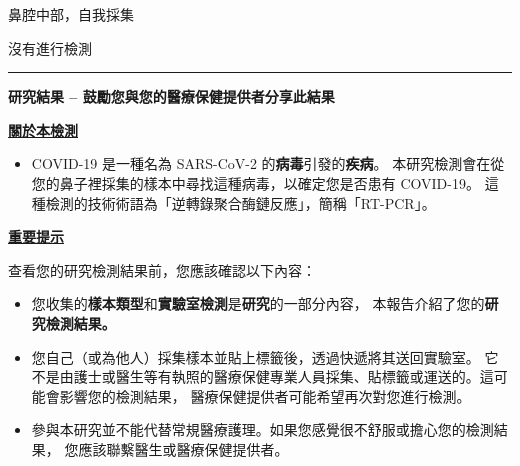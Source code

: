 \documentclass[10pt]{article}
\newcommand{\PageLine}{\rule{\textwidth}{0.25mm}}
\begin{document}
\sloppy %

\begin{description}[font=\normalfont,align=left,labelwidth=6em]
\item [\textbf{\VAR{pat_name|e}}]
\item [\textbf{出生日期：}] 
\item [\textbf{標本：}] 鼻腔中部，自我採集
\item [\textbf{採集條碼：}] 
\item [\textbf{採集日期：}] 
\item [\textbf{報告日期：}]
  沒有進行檢測
\end{description}

\PageLine

\begin{center}
\Large
\textbf{研究結果 – 鼓勵您與您的醫療保健提供者分享此結果}
\end{center}

\bigskip

\large \underline{\textbf{關於本檢測}}

\begin{itemize}
\item

  COVID-19 是一種名為 SARS-CoV-2 的\textbf{病毒}引發的\textbf{疾病}。
  本研究檢測會在從您的鼻子裡採集的樣本中尋找這種病毒，以確定您是否患有 COVID-19。
  這種檢測的技術術語為「逆轉錄聚合酶鏈反應」，簡稱「RT-PCR」。

\end{itemize}

\bigskip

\large \underline{\textbf{重要提示}}

查看您的研究檢測結果前，您應該確認以下內容：

\begin{itemize}
\item

  您收集的\textbf{樣本類型}和\textbf{實驗室檢測}是\textbf{研究}的一部分內容，
  本報告介紹了您的\textbf{研究檢測結果。}

\item

  您自己（或為他人）採集樣本並貼上標籤後，透過快遞將其送回實驗室。
  它不是由護士或醫生等有執照的醫療保健專業人員採集、貼標籤或運送的。這可能會影響您的檢測結果，
  醫療保健提供者可能希望再次對您進行檢測。

\item

  參與本研究並不能代替常規醫療護理。如果您感覺很不舒服或擔心您的檢測結果，
  您應該聯繫醫生或醫療保健提供者。

\end{itemize}
\end{document}
